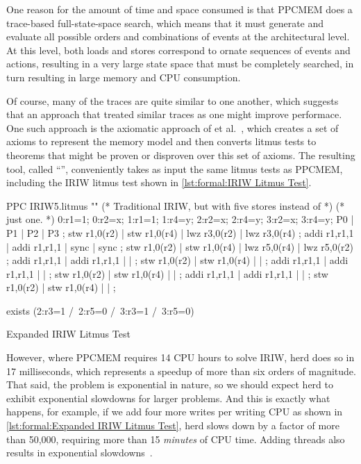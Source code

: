 One reason for the amount of time and space consumed is that PPCMEM does
a trace-based full-state-space search, which means that it must generate
and evaluate all possible orders and combinations of events at the
architectural level.
At this level, both loads and stores correspond to ornate sequences
of events and actions, resulting in a very large state space that must
be completely searched, in turn resulting in large memory and CPU
consumption.

Of course, many of the traces are quite similar to one another, which
suggests that an approach that treated similar traces as one might
improve performace.
One such approach is the axiomatic approach of
 et al.~\cite{Alglave:2014:HCM:2594291.2594347},
which creates a set of axioms to represent the memory model and then
converts litmus tests to theorems that might be proven or disproven
over this set of axioms.
The resulting tool, called ``'',  conveniently takes as input the
same litmus tests as PPCMEM, including the IRIW litmus test shown in
\cref{lst:formal:IRIW Litmus Test}.

\begin{listing}
\begin{fcvlabel}
\begin{VerbatimL}[commandchars=\%\@\$]
PPC IRIW5.litmus
""
(* Traditional IRIW, but with five stores instead of *)
(* just one.                                         *)
{
0:r1=1; 0:r2=x;
1:r1=1;         1:r4=y;
        2:r2=x; 2:r4=y;
        3:r2=x; 3:r4=y;
}
P0           | P1           | P2           | P3           ;
stw r1,0(r2) | stw r1,0(r4) | lwz r3,0(r2) | lwz r3,0(r4) ;
addi r1,r1,1 | addi r1,r1,1 | sync         | sync         ;
stw r1,0(r2) | stw r1,0(r4) | lwz r5,0(r4) | lwz r5,0(r2) ;
addi r1,r1,1 | addi r1,r1,1 |              |              ;
stw r1,0(r2) | stw r1,0(r4) |              |              ;
addi r1,r1,1 | addi r1,r1,1 |              |              ;
stw r1,0(r2) | stw r1,0(r4) |              |              ;
addi r1,r1,1 | addi r1,r1,1 |              |              ;
stw r1,0(r2) | stw r1,0(r4) |              |              ;

exists
(2:r3=1 /\ 2:r5=0 /\ 3:r3=1 /\ 3:r5=0)
\end{VerbatimL}
\end{fcvlabel}
\caption{Expanded IRIW Litmus Test}
\label{lst:formal:Expanded IRIW Litmus Test}
\end{listing}

However, where PPCMEM requires 14 CPU hours to solve IRIW, herd does so
in 17 milliseconds, which represents a speedup of more than six orders
of magnitude.
That said, the problem is exponential in nature, so we should expect
herd to exhibit exponential slowdowns for larger problems.
And this is exactly what happens, for example, if we add four more writes
per writing CPU as shown in
\cref{lst:formal:Expanded IRIW Litmus Test},
herd slows down by a factor of more than 50,000, requiring more than
15 \emph{minutes} of CPU time.
Adding threads also results in exponential
slowdowns~\cite{PaulEMcKenney2014weakaxiom}.

